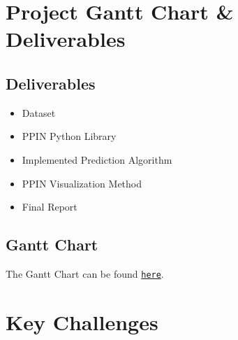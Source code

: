

\section{Project Gantt Chart \& Deliverables}
\subsection{Deliverables}
\begin{itemize}
    \item Dataset
    \item PPIN Python Library 
    \item Implemented Prediction Algorithm
    \item PPIN Visualization Method
    \item Final Report
\end{itemize}

\subsection{Gantt Chart}
 The Gantt Chart can be found \href{https://docs.google.com/spreadsheets/d/177G2Ug8ePJ5wdr1S0T3gbmti7pWHkpZjnaGsunB9-Pk/edit?usp=sharing}{\texttt{here}}.

\section{Key Challenges}

